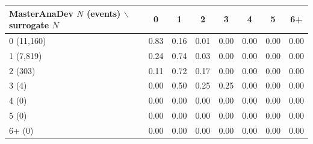 \begin{tabular}{lccccccc}
\toprule
MasterAnaDev $N$ (events) $\backslash$ surrogate $N$ & 0 & 1 & 2 & 3 & 4 & 5 & 6+ \\
\midrule
0 (11,160) & 0.83 & 0.16 & 0.01 & 0.00 & 0.00 & 0.00 & 0.00 \\
1 (7,819) & 0.24 & 0.74 & 0.03 & 0.00 & 0.00 & 0.00 & 0.00 \\
2 (303) & 0.11 & 0.72 & 0.17 & 0.00 & 0.00 & 0.00 & 0.00 \\
3 (4) & 0.00 & 0.50 & 0.25 & 0.25 & 0.00 & 0.00 & 0.00 \\
4 (0) & 0.00 & 0.00 & 0.00 & 0.00 & 0.00 & 0.00 & 0.00 \\
5 (0) & 0.00 & 0.00 & 0.00 & 0.00 & 0.00 & 0.00 & 0.00 \\
6+ (0) & 0.00 & 0.00 & 0.00 & 0.00 & 0.00 & 0.00 & 0.00 \\
\bottomrule
\end{tabular}
